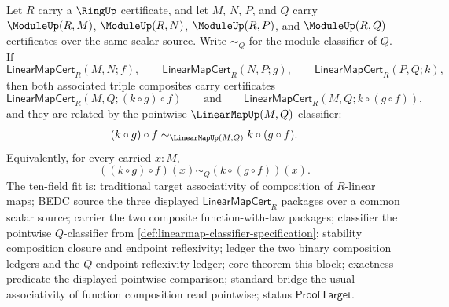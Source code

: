 \begin{theorem}
\label{thm:module-linearmap-composition-associativity-certificate}
Let $R$ carry a $\RingUp$ certificate, and let $M$, $N$, $P$, and $Q$ carry $\ModuleUp(R,M)$, $\ModuleUp(R,N)$, $\ModuleUp(R,P)$, and $\ModuleUp(R,Q)$ certificates over the same scalar source. Write $\sim_Q$ for the module classifier of $Q$. If
$$
\mathsf{LinearMapCert}_R(M,N;f),\qquad
\mathsf{LinearMapCert}_R(N,P;g),\qquad
\mathsf{LinearMapCert}_R(P,Q;k),
$$
then both associated triple composites carry certificates
$$
\mathsf{LinearMapCert}_R(M,Q;(k\circ g)\circ f)
\qquad\text{and}\qquad
\mathsf{LinearMapCert}_R(M,Q;k\circ(g\circ f)),
$$
and they are related by the pointwise $\LinearMapUp(M,Q)$ classifier:
$$
(k\circ g)\circ f\sim_{\LinearMapUp(M,Q)}k\circ(g\circ f).
$$
Equivalently, for every carried $x:M$,
$$
((k\circ g)\circ f)(x)\sim_Q(k\circ(g\circ f))(x).
$$
The ten-field fit is: traditional target associativity of composition of $R$-linear maps; BEDC source the three displayed $\mathsf{LinearMapCert}_R$ packages over a common scalar source; carrier the two composite function-with-law packages; classifier the pointwise $Q$-classifier from \autoref{def:linearmap-classifier-specification}; stability composition closure and endpoint reflexivity; ledger the two binary composition ledgers and the $Q$-endpoint reflexivity ledger; core theorem this block; exactness predicate the displayed pointwise comparison; standard bridge the usual associativity of function composition read pointwise; status $\mathsf{ProofTarget}$.
\end{theorem}
